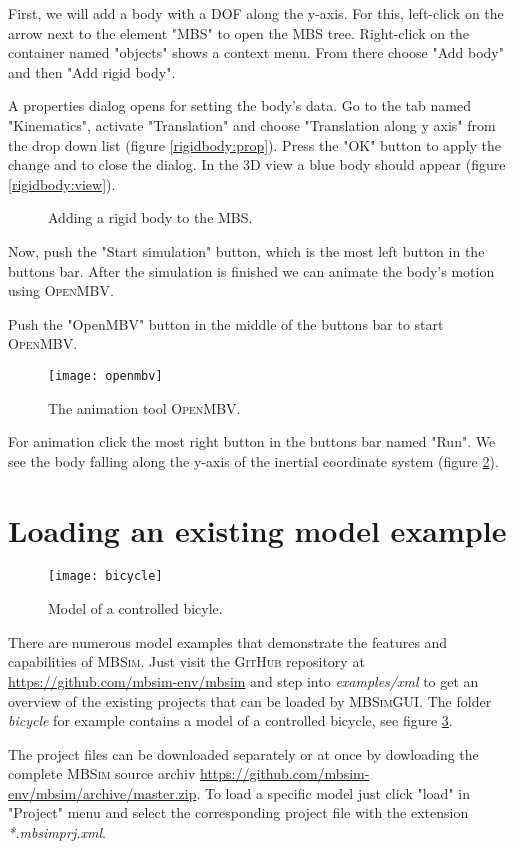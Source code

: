 \documentclass[
a4paper,
fleqn,
DIV=15,
pagesize
]{scrartcl}
\begin{document}
First, we will add a body with a DOF along the {\color{green}y-axis}.  For this,
left-click on the arrow next to the element "MBS" to open the MBS tree.
Right-click on the container named "objects" shows a context menu. From there
choose "Add body" and then "Add rigid body".

A properties dialog opens for setting the body's data. Go to the tab named
"Kinematics", activate "Translation" and choose "Translation along y axis" from
the drop down list (figure \ref{rigidbody:prop}). Press the "OK" button to
apply the change and to close the dialog. In the 3D view a blue body should
appear (figure \ref{rigidbody:view}).
\begin{figure}
\centering
{}
\caption{Adding a rigid body to the MBS.} \label{rigidbody}
\end{figure}

Now, push the "Start simulation" button, which is the most left button in the
buttons bar. After the simulation is finished we can animate the body's
motion using \textsc{OpenMBV}.

Push the "OpenMBV" button in the middle of the buttons bar to start
\textsc{OpenMBV}.
\begin{figure}
\centering
\texttt{[image: openmbv]}
\caption{The animation tool \textsc{OpenMBV}.} \label{openmbv}
\end{figure}
For animation click
the most right button in the buttons bar named "Run". We see the body falling
along the {\color{green}y-axis} of the inertial coordinate system (figure
\ref{openmbv}).

\section{Loading an existing model example}

\begin{figure}
\centering
\texttt{[image: bicycle]}
\caption{Model of a controlled bicyle.} \label{bicycle}
\end{figure}
There are numerous model examples that demonstrate the features and capabilities of \textsc{MBSim}. Just visit the \textsc{GitHub} repository at \url{https://github.com/mbsim-env/mbsim} and step into \emph{examples/xml} to get an overview of the existing projects that can be loaded by \textsc{MBSimGUI}. The folder \emph{bicycle} for example contains a model of a controlled bicycle, see figure \ref{bicycle}.

The project files can be downloaded separately or at once by dowloading the complete \textsc{MBSim} source archiv \url{https://github.com/mbsim-env/mbsim/archive/master.zip}. To load a specific model just click "load" in "Project" menu and select the corresponding project file with the extension \emph{*.mbsimprj.xml}.
\end{document}
